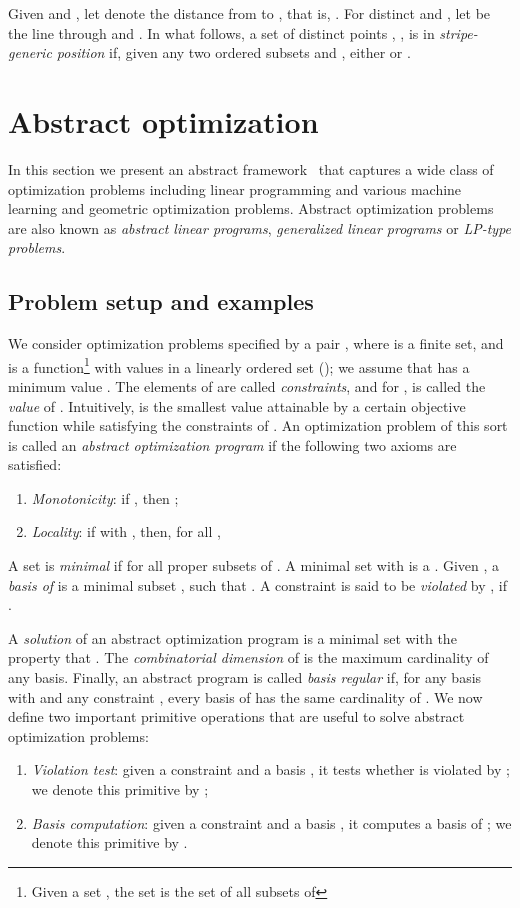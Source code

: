 \documentclass[onecolumn,journal,letterpaper]{IEEEtran}
\begin{document}
Given  and , let  denote the
distance from  to , that is, .
For distinct  and , let  be
the line through  and .
In what follows, a set of distinct points
, , is in \emph{stripe-generic
  position} if, given any two ordered subsets  and
, either  or
.


\section{Abstract optimization}
\label{sec:LP-type problems}
In this section we present an abstract framework~\cite{PKA-SS:01,BG-EW:01}
that captures a wide class of optimization problems including linear
programming and various machine learning and geometric optimization
problems. Abstract optimization problems are also known as \emph{abstract
  linear programs}, \emph{generalized linear programs} or \emph{LP-type
  problems}.


\subsection{Problem setup and examples }
We consider optimization problems specified by a pair , where
 is a finite set, and  is a
function\footnote{Given a set , the set  is the set of all subsets
  of } with values in a linearly ordered set (); we assume
that  has a minimum value . The elements of  are called
\emph{constraints}, and for ,  is called the
\emph{value} of . Intuitively,  is the smallest value
attainable by a certain objective function while satisfying the constraints
of . An optimization problem of this sort is called an \emph{abstract
  optimization program} if the following two axioms are satisfied:
\begin{enumerate}
\item \emph{Monotonicity}: if , then ;
\item \emph{Locality}: if  with , then, for all ,
  
\end{enumerate}
A set  is \emph{minimal} if  for all
proper subsets  of .  A minimal set  with  is
a .  Given , a \emph{basis of } is a minimal
subset , such that .  A
constraint  is said to be \emph{violated} by , if .

A \emph{solution} of an abstract optimization program  is a
minimal set  with the property that .
The \emph{combinatorial dimension}  of  is the maximum
cardinality of any basis. Finally, an abstract program is called
\emph{basis regular} if, for any basis with  and any
constraint , every basis of  has the same
cardinality of . We now define two important primitive operations that
are useful to solve abstract optimization problems:
\begin{enumerate}
\item \emph{Violation test}: given a constraint  and a basis , it
  tests whether  is violated by ; we denote this primitive by
  ;
\item \emph{Basis computation}: given a constraint  and a basis , it
  computes a basis of ;  we denote this primitive by
  .
\end{enumerate}
\end{document}

